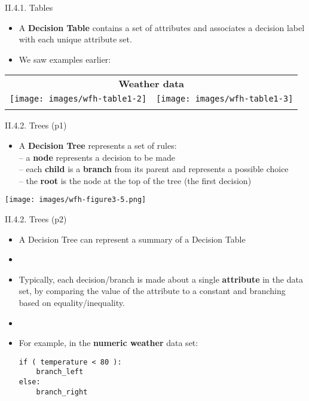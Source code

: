 \documentclass[handout]{beamer}
\newcommand{\strong}[1]{\textbf{\color{teal} #1}}
\newcommand{\stronger}[1]{\textbf{\color{purple} #1}}
\begin{document}
\begin{frame}{II.4.1. Tables}
\begin{itemize}
\item A \strong{Decision Table} contains a set of attributes and associates a decision label with each unique attribute set.
\item We saw examples earlier:
\end{itemize}
\begin{center}
\begin{tabular}{cc}
\multicolumn{2}{c}{\strong{Weather data}} \\
\texttt{[image: images/wfh-table1-2]} &
\texttt{[image: images/wfh-table1-3]} \\
\cite[Table 1.2]{WFH3:2011} &
\cite[Table 1.3]{WFH3:2011} \\
\end{tabular}
\end{center}
\end{frame}
\begin{frame}{II.4.2. Trees (p1)}
\begin{itemize}
\item A \strong{Decision Tree} represents a set of rules:\\
-- a \stronger{node} represents a decision to be made\\
-- each \stronger{child} is a \stronger{branch} from its parent and represents a possible choice\\
-- the \stronger{root} is the node at the top of the tree (the first decision)
\end{itemize}
\begin{center}
\texttt{[image: images/wfh-figure3-5.png]}
\cite[Fig 3.5]{WFH3:2011}
\end{center}
\end{frame}
\begin{frame}[fragile]{II.4.2. Trees (p2)}
\begin{itemize}
\item A Decision Tree can represent a summary of a Decision Table
\item[]
\item Typically, each decision/branch is made about a single \strong{attribute} in the data set, by comparing the value of the attribute to a constant and branching based on equality/inequality.
\item[]
\item For example, in the \strong{numeric weather} data set:
\begin{lstlisting}[numbers=none]
if ( temperature < 80 ):
	branch_left
else:
	branch_right
\end{lstlisting}
\end{itemize}
\end{frame}
\end{document}
